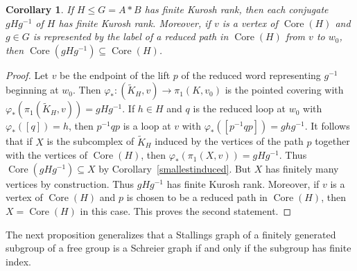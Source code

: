 \documentclass[11pt,reqno]{amsart}
\newtheorem{Cor}[Thm]{Corollary}
\begin{document}
\begin{Cor}\label{conjugaterank}
If $H\leq G=A\ast B$ has finite Kurosh rank, then each conjugate $gHg{^{-1}}$ of $H$ has finite Kurosh rank.  Moreover, if $v$ is a vertex of ${\mathop{\mathrm{Core}}\nolimits}(H)$ and $g\in G$ is represented by the label of a reduced path in ${\mathop{\mathrm{Core}}\nolimits}(H)$ from $v$ to $w_0$, then ${\mathop{\mathrm{Core}}\nolimits}(gHg{^{-1}})\subseteq {\mathop{\mathrm{Core}}\nolimits}(H)$.
\end{Cor}
\begin{proof}
Let $v$ be the endpoint of the lift $p$ of the reduced word representing $g{^{-1}}$ beginning at $w_0$.  Then ${\varphi}_*\colon ({\ensuremath{\widetilde {K}}}_H,v){\rightarrow} \pi_1(K,v_0)$ is the pointed covering with ${\varphi}_*(\pi_1({\ensuremath{\widetilde {K}}}_H,v))=gHg{^{-1}}$.  If $h\in H$ and $q$ is the reduced loop at $w_0$ with ${\varphi}_*([q])=h$, then $p{^{-1}} qp$ is a loop at $v$ with ${\varphi}_*([p{^{-1}} qp])=ghg{^{-1}}$.  It follows that if $X$ is the subcomplex of ${\ensuremath{\widetilde {K}}}_H$ induced by the vertices of the path $p$ together with the vertices of ${\mathop{\mathrm{Core}}\nolimits}(H)$, then ${\varphi}_*(\pi_1(X,v))=gHg{^{-1}}$.  Thus ${\mathop{\mathrm{Core}}\nolimits}(gHg{^{-1}})\subseteq X$ by Corollary~\ref{smallestinduced}. But $X$ has finitely many vertices by construction.  Thus $gHg{^{-1}}$ has finite Kurosh rank.  Moreover, if $v$ is a vertex of ${\mathop{\mathrm{Core}}\nolimits}(H)$ and $p$ is chosen to be a reduced path in ${\mathop{\mathrm{Core}}\nolimits}(H)$, then $X={\mathop{\mathrm{Core}}\nolimits}(H)$ in this case.  This proves the second statement.
\end{proof}

The next proposition generalizes that a Stallings graph of a finitely generated subgroup of a free group is a Schreier graph if and only if the subgroup has finite index.
\end{document}
